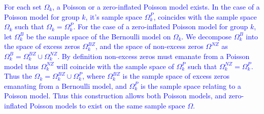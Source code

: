 \documentclass[11pt,letterpaper]{article}
\numberwithin{equation}{section}
\numberwithin{equation}{section}
\numberwithin{equation}{section}
\begin{document}
	
\textcolor{blue}{
For each set $\Omega_k$, a Poisson or a zero-inflated Poisson model exists. In the case of a Poisson model for group $k$, it's sample space $\Omega^P_k$, coincides with the sample space $\Omega_k$ such that  $\Omega_k = \Omega^P_k$.  
For the case of a zero-inflated Poisson model for group $k$, let $\Omega_k^{B}$ be the sample space of the Bernoulli  model on $\Omega_k$. We decompose $\Omega_k^{B}$ into the space of excess zeros $\Omega_k^{BZ}$, and the space of non-excess zeros $\Omega^{NZ}$ as $\Omega_k^B = \Omega_k^{BZ} \cup \Omega_k^{NZ} $.   By definition non-excess zeros must emanate from a Poisson model thus $\Omega_k^{NZ} $ will coincide with the sample space of $\Omega^P_k$ such that $ \Omega_k^{NZ} =  \Omega^P_k$. Thus the  $\Omega_k = \Omega^{BZ}_k \cup \Omega^{P}_k $, where $\Omega^{BZ}_k$ is the sample space of excess zeros emanating from a Bernoulli model, and $\Omega^{P}_k$ is the sample space relating to a Poisson model. Thus this construction allows both Poisson models, and zero-inflated Poisson models to exist on the same sample space $\Omega$.   }
\end{document}
